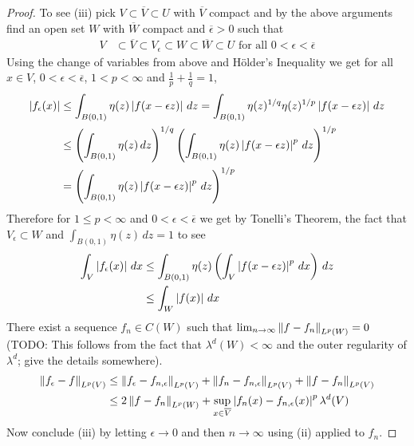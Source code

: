 \begin{proof}
To see (iii) pick $V \subset \overline{V} \subset U$ with $\overline{V}$ compact and by the above arguments find an open set $W$ with $\overline{W}$ compact and $\overline{\epsilon}>0$ such
that
\begin{align*}
V &\subset \overline{V} \subset V_\epsilon \subset W \subset \overline{W} \subset U \text{ for all $0 < \epsilon < \overline{\epsilon}$}
\end{align*}
Using the change of variables from above and H\"{o}lder's Inequality we get for all $x \in V$, $0 < \epsilon < \overline{\epsilon}$, $1 < p < \infty$ and $\frac{1}{p} + \frac{1}{q} =1$,
\begin{align*}
\left \vert f_\epsilon(x) \right \vert &\leq \int_{B(0,1)} \eta(z) \left \vert f(x-\epsilon z) \right \vert \, dz = \int_{B(0,1)} \eta(z)^{1/q} \eta(z)^{1/p} \left \vert f(x-\epsilon z) \right \vert \, dz \\
&\leq \left( \int_{B(0,1)} \eta(z) \, dz \right)^{1/q} \left(\int_{B(0,1)} \eta(z) \left \vert f(x-\epsilon z) \right \vert^p \, dz\right)^{1/p} \\
&=\left(\int_{B(0,1)} \eta(z) \left \vert f(x-\epsilon z) \right \vert^p \, dz \right)^{1/p}
\end{align*}
Therefore for $1 \leq p < \infty$ and $0 < \epsilon < \overline{\epsilon}$ we get by Tonelli's Theorem, the fact that $V_\epsilon \subset W$ and $\int_{B(0,1)} \eta(z) \, dz=1$ to see
\begin{align*}
\int_V \left \vert f_\epsilon(x) \right \vert \, dx &\leq \int_{B(0,1)} \eta(z) \left( \int_V \left \vert f(x-\epsilon z) \right \vert^p \, dx \right) \, dz \\
&\leq \int_W \left \vert f(x) \right \vert \, dx
\end{align*}
There exist a sequence $f_n \in C(W)$ such that $\lim_{n \to \infty} \left \lVert f - f_n \right \rVert_{L^p(W)} = 0$ (TODO: This follows from the fact that $\lambda^d(W) < \infty$ and the outer regularity of $\lambda^d$; give the details somewhere).  
\begin{align*}
\left \lVert f_\epsilon - f \right \rVert_{L^p(V)} &\leq \left \lVert f_\epsilon - f_{n,\epsilon} \right \rVert_{L^p(V)} + \left \lVert f_n - f_{n,\epsilon} \right \rVert_{L^p(V)} + \left \lVert f - f_n \right \rVert_{L^p(V)} \\
&\leq 2 \left \lVert f - f_{n} \right \rVert_{L^p(W)} + \sup_{x \in \overline{V}} \left \vert f_n(x) - f_{n,\epsilon}(x) \right \vert^p\lambda^d(V)  \\
\end{align*}
Now conclude (iii) by letting $\epsilon \to 0$ and then $n \to \infty$ using (ii) applied to $f_n$.  


\end{proof}
